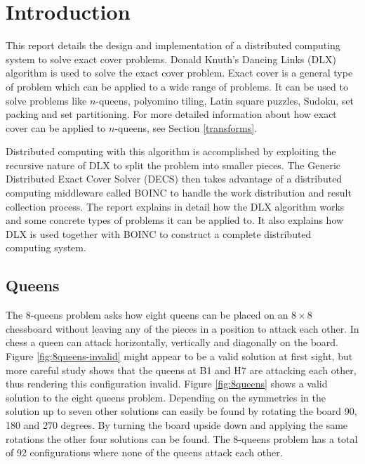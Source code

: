 
\chapter{Introduction}

This report details the design and implementation of a distributed computing system to solve exact cover problems.
Donald Knuth's Dancing Links (DLX) algorithm \cite{knuth00dancing} is used to solve the exact cover problem.
Exact cover is a general type of problem which can be applied to a wide range of problems.
It can be used to solve problems like $n$-queens, polyomino tiling, Latin square puzzles, Sudoku, set packing and set partitioning.
For more detailed information about how exact cover can be applied to $n$-queens, see Section \ref{transforms}.

Distributed computing with this algorithm is accomplished by exploiting the recursive nature of DLX to split the problem into smaller pieces.
The Generic Distributed Exact Cover Solver (DECS) then takes advantage of a distributed computing middleware called BOINC \cite{boinc} to handle the work distribution and result collection process.
The report explains in detail how the DLX algorithm works and some concrete types of problems it can be applied to.
It also explains how DLX is used together with BOINC to construct a complete distributed computing system.



\section{Queens}
\label{intro_queens}

The 8-queens problem asks how eight queens can be placed on an $8 \times 8$ chessboard without leaving any of the pieces in a position to attack each other.
In chess a queen can attack horizontally, vertically and diagonally on the board.
Figure \ref{fig:8queens-invalid} might appear to be a valid solution at first sight, but more careful study shows that the queens at B1 and H7 are attacking each other, thus rendering this configuration invalid.
Figure \ref{fig:8queens} shows a valid solution to the eight queens problem.
Depending on the symmetries in the solution up to seven other solutions can easily be found by rotating the board 90, 180 and 270 degrees.
By turning the board upside down and applying the same rotations the other four solutions can be found.
The 8-queens problem has a total of 92 configurations where none of the queens attack each other.

